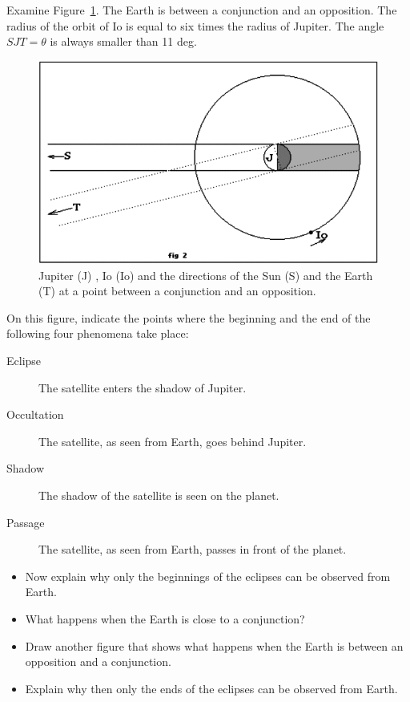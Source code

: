 \documentclass{tufte-handout}
\begin{document}
Examine Figure~\ref{fig:JupIo}. The Earth is between a conjunction and an opposition. The radius of the orbit of Io is equal to six times the radius of Jupiter. The angle $SJT = \theta$ is always smaller than 11 deg.
\begin{figure}
\includegraphics{RomerFig2.png}
\caption{Jupiter (J) , Io (Io) and the directions of the Sun (S) and the Earth (T) at a point between a conjunction and an opposition.}
\label{fig:JupIo}
\end{figure}
On this figure, indicate the points where the beginning and the end of the following four phenomena take place:
\begin{description}
\item[Eclipse] The satellite enters the shadow of Jupiter.
\item[Occultation] The satellite, as seen from Earth, goes behind Jupiter.
\item[Shadow] The shadow of the satellite is seen on the planet.
\item[Passage] The satellite, as seen from Earth, passes in front of the planet.
\end{description}

\begin{itemize}
\item Now explain why only the beginnings of the eclipses can be observed from Earth.

\item What happens when the Earth is close to a conjunction?
\item Draw another figure that shows what happens when the Earth is between an opposition and a conjunction. 
\item Explain why then only the ends of the eclipses can be observed from Earth.
\end{itemize}
\end{document}
